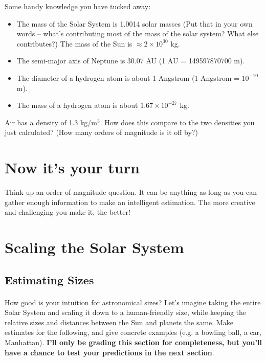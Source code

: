 \documentclass[12pt]{article}
\begin{document}
\noindent Some handy knowledge you have tucked away: \\

\begin{itemize}
    \item The mass of the Solar System is 1.0014 solar masses (Put that in your own words -- what's contributing most of the mass of the solar system? What else contributes?) The mass of the Sun is ${\approx2\times10^{30}}$ kg. 
    \item The semi-major axis of Neptune is 30.07 AU (1 AU = 149597870700 m).
    \item The diameter of a hydrogen atom is about 1 Angstrom (1 Angstrom = $ 10^{-10}$m). 
    \item The mass of a hydrogen atom is about ${1.67\times10^{-27}}$ kg.
\end{itemize}

Air has a density of 1.3 kg/m$^3$. How does this compare to the two densities you just calculated? (How many orders of magnitude is it off by?)

\section*{Now it's your turn}

Think up an order of magnitude question. It can be anything as long as you can gather enough information to make an intelligent estimation. The more creative and challenging you make it, the better!

\section*{Scaling the Solar System}

\subsection*{Estimating Sizes} \label{guesses}
\paragraph{}
How good is your intuition for astronomical sizes? Let's imagine taking the entire Solar System and scaling it down to a human-friendly size, while keeping the relative sizes and distances between the Sun and planets the same. Make estimates for the following, and give concrete examples (e.g. a bowling ball, a car, Manhattan). \textbf{I'll only be grading this section for completeness, but you'll have a chance to test your predictions in the next section}.
\end{document}
